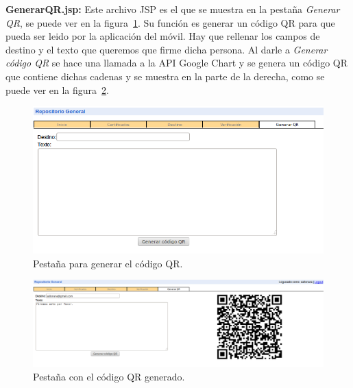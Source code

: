 \begin{description}
\item \textbf{GenerarQR.jsp:} Este archivo JSP es el que se muestra en la pestaña \textit{Generar QR}, se puede ver en la figura~\ref{fig:pestanhaQR}. Su función es generar un código QR para que pueda ser leido por la aplicación del móvil. Hay que rellenar los campos de destino y el texto que queremos que firme dicha persona. Al darle a \textit{Generar código QR} se hace una llamada a la API Google Chart y se genera un código QR que contiene dichas cadenas y se muestra en la parte de la derecha, como se puede ver en la figura~\ref{fig:codigoQR}.

\begin{figure}
    \includegraphics[scale=0.5]{./GoogleAppEngine/imagenes/pestanhaQR.png}
  \caption{Pestaña para generar el código QR.}
  \label{fig:pestanhaQR}
\end{figure}

\begin{figure}

    \includegraphics[scale=0.5]{./GoogleAppEngine/imagenes/codigoQR.png}
  \caption{Pestaña con el código QR generado.}
  \label{fig:codigoQR}
\end{figure}

\end{description}


